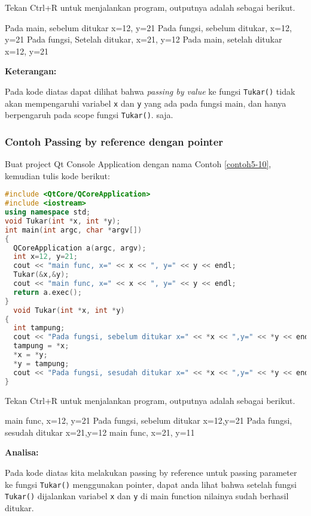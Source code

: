 Tekan Ctrl+R untuk menjalankan program, outputnya adalah sebagai
berikut.

\begin{lcverbatim}
Pada main, sebelum ditukar x=12, y=21
Pada fungsi, sebelum ditukar, x=12, y=21
Pada fungsi, Setelah ditukar, x=21, y=12
Pada main, setelah ditukar x=12, y=21
\end{lcverbatim}

\textbf{Keterangan:}

Pada kode diatas dapat dilihat bahwa \emph{passing by value} ke fungsi
\texttt{Tukar()} tidak akan mempengaruhi variabel \texttt{x} dan
\texttt{y} yang ada pada fungsi main, dan hanya berpengaruh pada scope
fungsi \texttt{Tukar()}. saja.

\subsubsection*{Contoh Passing by reference dengan pointer}

Buat project Qt Console Application dengan nama Contoh \ref{contoh5-10}, kemudian
tulis kode berikut:

\begin{lstlisting}[language=c++, caption=Passing by reference dengan pointer, label=contoh5-10]
#include <QtCore/QCoreApplication>
#include <iostream>
using namespace std;
void Tukar(int *x, int *y);
int main(int argc, char *argv[])
{
  QCoreApplication a(argc, argv);
  int x=12, y=21;
  cout << "main func, x=" << x << ", y=" << y << endl;
  Tukar(&x,&y);
  cout << "main func, x=" << x << ", y=" << y << endl;
  return a.exec();
}
  void Tukar(int *x, int *y)
{
  int tampung;
  cout << "Pada fungsi, sebelum ditukar x=" << *x << ",y=" << *y << endl;
  tampung = *x;
  *x = *y;
  *y = tampung;
  cout << "Pada fungsi, sesudah ditukar x=" << *x << ",y=" << *y << endl;
}
\end{lstlisting}

Tekan Ctrl+R untuk menjalankan program, outputnya adalah sebagai
berikut.

\begin{lcverbatim}
main func, x=12, y=21
Pada fungsi, sebelum ditukar x=12,y=21
Pada fungsi, sesudah ditukar x=21,y=12
main func, x=21, y=11
\end{lcverbatim}

\textbf{Analisa:}

Pada kode diatas kita melakukan passing by reference untuk passing
parameter ke fungsi \texttt{Tukar()} menggunakan pointer, dapat anda
lihat bahwa setelah fungsi \texttt{Tukar()} dijalankan variabel
\texttt{x} dan \texttt{y} di main function nilainya sudah berhasil
ditukar.

